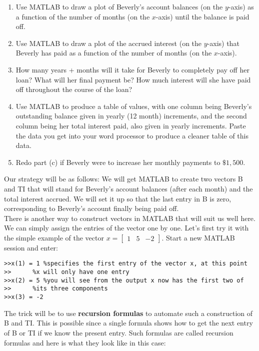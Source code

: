 \documentclass[../main.tex]{subfiles}
\begin{document}
\begin{enumerate}[label=(\alph*)]
\item Use MATLAB to draw a plot of Beverly's account balances (on the $y$-axis) as a function of the number of months (on the $x$-axis) until the balance is paid off.
\item  Use MATLAB to draw a plot of the accrued interest (on the $y$-axis) that Beverly has paid as a function of the number of months (on the $x$-axis).
\item How many years + months will it take for Beverly to completely pay off her loan? What will her final payment be? How much interest will she have paid off throughout the course of the loan?
\item Use MATLAB to produce a table of values, with one column being Beverly's outstanding balance given in yearly (12 month) increments, and the second column being her total interest paid, also given in yearly increments. Paste the data you get into your word processor to produce a cleaner table of this data.
\item Redo part (c) if Beverly were to increase her monthly payments to $\$ 1,500$.

\end{enumerate}

Our strategy will be as follows: We will get MATLAB to create two vectors B
and TI that will stand for Beverly's account balances (after each month) and the
total interest accrued. We will set it up so that the last entry in B is zero,
corresponding to Beverly's account finally being paid off. \\

There is another way to construct vectors in MATLAB that will suit us well here. We can simply assign the entries of the vector one by one. Let's first try it with the simple example of the vector $x=\left[\begin{array}{lll}1 & 5 & -2\end{array}\right]$. Start a new MATLAB session and enter:


\begin{verbatim}
>>x(1) = 1 %specifies the first entry of the vector x, at this point
>> 		%x will only have one entry 
>>x(2) = 5 %you will see from the output x now has the first two of 
>>		%its three components 
>>x(3) = -2
\end{verbatim}

The trick will be to use \textbf{recursion formulas} to automate such a construction of B
and TI. This is possible since a single formula shows how to get the next entry of
B or TI if we know the present entry. Such formulas are called recursion formulas
and here is what they look like in this case:
\end{document}
